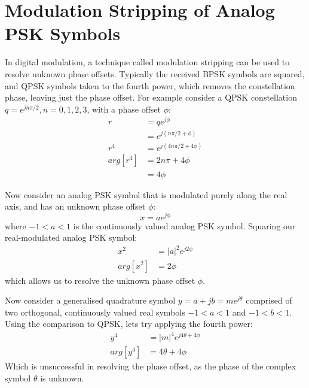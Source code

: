 \documentclass{article}
\begin{document}
\section{Modulation Stripping of Analog PSK Symbols}

In digital modulation, a technique called modulation stripping can be used to resolve unknown phase offsets. Typically the received BPSK symbols are squared, and QPSK symbols taken to the fourth power, which removes the constellation phase, leaving just the phase offset.  For example consider a QPSK constellation $q=e^{jn\pi/2}, n=0,1,2,3$, with a phase offset $\phi$:
\begin{equation}
\begin{split}
r &= qe^{j\phi} \\
  &= e^{j(n\pi/2+\phi)} \\
r^4 &= e^{j(4n\pi/2+4\phi)} \\
arg[r^4] &= 2n\pi + 4\phi \\
         &= 4\phi
\end{split}
\end{equation}

Now consider an analog PSK symbol that is modulated purely along the real axis, and has an unknown phase offset $\phi$:
\begin{equation}
x = ae^{j\phi}
\end{equation}
where $-1<a<1$ is the continuously valued analog PSK symbol.  Squaring our real-modulated analog PSK symbol:
\begin{equation}
\begin{split}
x^2 &= |a|^2e^{j2\phi} \\
arg[x^2] &= 2\phi
\end{split}
\end{equation}
which allows us to resolve the unknown phase offset $\phi$.

Now consider a generalised quadrature symbol $y=a+jb=me^{j\theta}$ comprised of two orthogonal, continuously valued real symbols $-1<a<1$ and $-1<b<1$.  Using the comparison to QPSK, lets try applying the fourth power:
\begin{equation}
\begin{split}
y^4 &= |m|^4e^{j4\theta+4\phi} \\
arg[y^4] &= 4\theta+4\phi
\end{split}
\end{equation}
Which is unsuccessful in resolving the phase offset, as the phase of the complex symbol $\theta$ is unknown.
\end{document}
